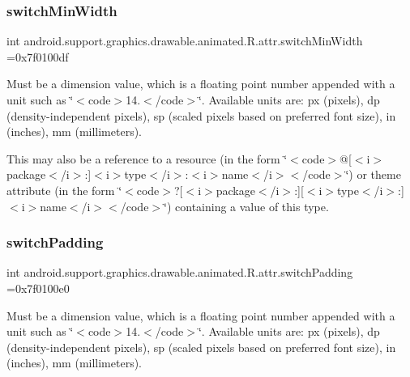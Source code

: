 \subsubsection{\texorpdfstring{switch\+Min\+Width}{switchMinWidth}}
{\footnotesize\ttfamily int android.\+support.\+graphics.\+drawable.\+animated.\+R.\+attr.\+switch\+Min\+Width =0x7f0100df\hspace{0.3cm}{\ttfamily [static]}}

Must be a dimension value, which is a floating point number appended with a unit such as \char`\"{}$<$code$>$14.\+5sp$<$/code$>$\char`\"{}. Available units are\+: px (pixels), dp (density-\/independent pixels), sp (scaled pixels based on preferred font size), in (inches), mm (millimeters). 

This may also be a reference to a resource (in the form \char`\"{}$<$code$>$@\mbox{[}$<$i$>$package$<$/i$>$\+:\mbox{]}$<$i$>$type$<$/i$>$\+:$<$i$>$name$<$/i$>$$<$/code$>$\char`\"{}) or theme attribute (in the form \char`\"{}$<$code$>$?\mbox{[}$<$i$>$package$<$/i$>$\+:\mbox{]}\mbox{[}$<$i$>$type$<$/i$>$\+:\mbox{]}$<$i$>$name$<$/i$>$$<$/code$>$\char`\"{}) containing a value of this type. \mbox{\label{classandroid_1_1support_1_1graphics_1_1drawable_1_1animated_1_1R_1_1attr_a945fb4fcb4450ea6c20fcdc45c73affd}} 
\subsubsection{\texorpdfstring{switch\+Padding}{switchPadding}}
{\footnotesize\ttfamily int android.\+support.\+graphics.\+drawable.\+animated.\+R.\+attr.\+switch\+Padding =0x7f0100e0\hspace{0.3cm}{\ttfamily [static]}}

Must be a dimension value, which is a floating point number appended with a unit such as \char`\"{}$<$code$>$14.\+5sp$<$/code$>$\char`\"{}. Available units are\+: px (pixels), dp (density-\/independent pixels), sp (scaled pixels based on preferred font size), in (inches), mm (millimeters). 

